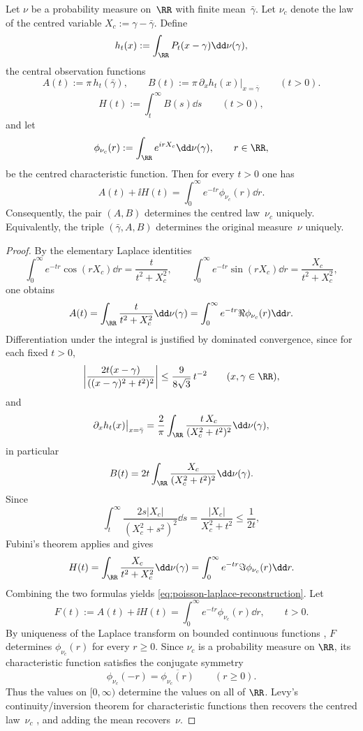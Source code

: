 \begin{proposition}%
\label{prop:poisson-central-two-channel}
Let $\nu$ be a probability measure on~$\RR$ with finite mean~$\bar{\gamma}$.
Let $\nu_c$ denote the law of the centred variable
$X_c:=\gamma-\bar{\gamma}$.  Define
\[
h_t(x):=\int_{\RR}P_t(x-\gamma)\dd\nu(\gamma),
\]
the central observation functions
\[
A(t):=\pi\,h_t(\bar{\gamma}),
\qquad
B(t):=\pi\,\partial_x h_t(x)\big|_{x=\bar{\gamma}}
\qquad(t>0).
\]
\[
H(t):=\int_t^\infty B(s)\dd s
\qquad(t>0),
\]
and let
\[
\phi_{\nu_c}(r):=\int_{\RR}e^{irX_c}\dd\nu(\gamma),
\qquad r\in\RR,
\]
be the centred characteristic function.  Then for every $t>0$ one has
\begin{equation}\label{eq:poisson-laplace-reconstruction}
A(t)+\ii H(t)
=\int_0^\infty e^{-tr}\phi_{\nu_c}(r)\dd r.
\end{equation}
Consequently, the pair $(A,B)$ determines the centred law~$\nu_c$
uniquely.  Equivalently, the triple $(\bar{\gamma},A,B)$ determines the
original measure~$\nu$ uniquely.
\end{proposition}

\ifdefined\JFAArticleMain
{}
\else
\begin{proof}
By the elementary Laplace identities
\[
\int_0^\infty e^{-tr}\cos(rX_c)\dd r=\frac{t}{t^2+X_c^2},
\qquad
\int_0^\infty e^{-tr}\sin(rX_c)\dd r=\frac{X_c}{t^2+X_c^2},
\]
one obtains
\[
A(t)
=\int_{\RR}\frac{t}{t^2+X_c^2}\dd\nu(\gamma)
=\int_0^\infty e^{-tr}\Re\phi_{\nu_c}(r)\dd r.
\]
Differentiation under the integral is justified by dominated convergence,
since for each fixed $t>0$,
\[
\left|\frac{2t(x-\gamma)}{((x-\gamma)^2+t^2)^2}\right|
\le \frac{9}{8\sqrt3}\,t^{-2}
\qquad(x,\gamma\in\RR),
\]
and
\[
\partial_x h_t(x)\big|_{x=\bar{\gamma}}
=\frac{2}{\pi}\int_{\RR}\frac{t\,X_c}{(X_c^2+t^2)^2}\dd\nu(\gamma),
\]
in particular
\[
B(t)=2t\int_{\RR}\frac{X_c}{(X_c^2+t^2)^2}\dd\nu(\gamma).
\]
Since
\[
\int_t^\infty \frac{2s|X_c|}{(X_c^2+s^2)^2}\dd s
=\frac{|X_c|}{X_c^2+t^2}
\le \frac{1}{2t},
\]
Fubini's theorem applies and gives
\[
H(t)
=\int_{\RR}\frac{X_c}{t^2+X_c^2}\dd\nu(\gamma)
=\int_0^\infty e^{-tr}\Im\phi_{\nu_c}(r)\dd r.
\]
Combining the two formulas yields
\eqref{eq:poisson-laplace-reconstruction}.  Let
\[
F(t):=A(t)+\ii H(t)
=\int_0^\infty e^{-tr}\phi_{\nu_c}(r)\dd r,
\qquad t>0 .
\]
By uniqueness of the Laplace transform on bounded continuous functions
\cite{Widder1941}, \(F\) determines \(\phi_{\nu_c}(r)\) for every
\(r\ge0\).  Since \(\nu_c\) is a probability measure on \(\RR\), its
characteristic function satisfies the conjugate symmetry
\[
\phi_{\nu_c}(-r)=\overline{\phi_{\nu_c}(r)}
\qquad(r\ge0).
\]
Thus the values on \( [0,\infty) \) determine the values on all of
\(\RR\).  Levy's continuity/inversion theorem for characteristic functions
then recovers the centred law~$\nu_c$ \cite{Lukacs1970,Feller1971}, and
adding the mean recovers~$\nu$.
\end{proof}
\fi

